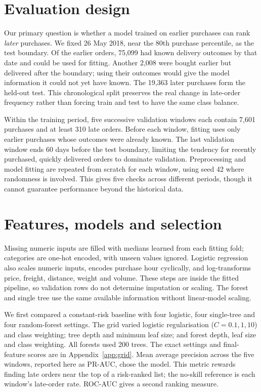 \documentclass[11pt,a4paper]{article}
\begin{document}
\section*{Evaluation design}
Our primary question is whether a model trained on earlier purchases can rank \emph{later} purchases. We fixed 26 May 2018, near the 80th purchase percentile, as the test boundary. Of the earlier orders, 75,099 had known delivery outcomes by that date and could be used for fitting. Another 2,008 were bought earlier but delivered after the boundary; using their outcomes would give the model information it could not yet have known. The 19,363 later purchases form the held-out test. This chronological split preserves the real change in late-order frequency rather than forcing train and test to have the same class balance.

Within the training period, five successive validation windows each contain 7,601 purchases and at least 310 late orders. Before each window, fitting uses only earlier purchases whose outcomes were already known. The last validation window ends 60 days before the test boundary, limiting the tendency for recently purchased, quickly delivered orders to dominate validation. Preprocessing and model fitting are repeated from scratch for each window, using seed 42 where randomness is involved. This gives five checks across different periods, though it cannot guarantee performance beyond the historical data.

\section*{Features, models and selection}
Missing numeric inputs are filled with medians learned from each fitting fold; categories are one-hot encoded, with unseen values ignored. Logistic regression also scales numeric inputs, encodes purchase hour cyclically, and log-transforms price, freight, distance, weight and volume. These steps are inside the fitted pipeline, so validation rows do not determine imputation or scaling. The forest and single tree use the same available information without linear-model scaling.

We first compared a constant-risk baseline with four logistic, four single-tree and four random-forest settings. The grid varied logistic regularisation ($C=0.1,1,10$) and class weighting; tree depth and minimum leaf size; and forest depth, leaf size and class weighting. All forests used 200 trees. The exact settings and final-feature scores are in Appendix~\ref{app:grid}. Mean average precision across the five windows, reported here as PR-AUC, chose the model. This metric rewards finding late orders near the top of a risk-ranked list; the no-skill reference is each window's late-order rate. ROC-AUC gives a second ranking measure.
\end{document}
